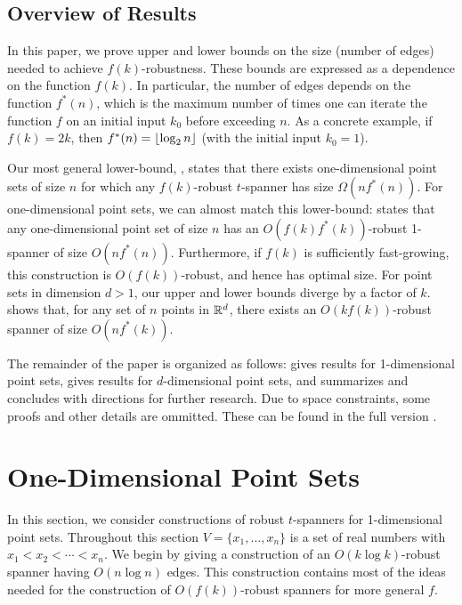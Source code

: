 \documentclass{cccg12}
\begin{document}
\subsection{Overview of Results}

In this paper, we prove upper and lower bounds on the size (number of
edges) needed to achieve $f(k)$-robustness.
These bounds are expressed as a dependence on the function $f(k)$.
In particular, the number of edges depends on the function $f^*(n)$,
which is the maximum number of times one can iterate the function $f$ on
an initial input $k_0$ before exceeding $n$.  As a concrete example, if
$f(k)=2k$, then  $f^*(n)={\lfloor \log_2 n \rfloor}$ (with the initial input $k_0=1$).

Our most general lower-bound, ,
states that there exists one-dimensional point sets of size $n$
for which any $f(k)$-robust $t$-spanner has size $\Omega(nf^*(n))$.
For one-dimensional point sets, we can almost match this lower-bound:
 states that any one-dimensional point set of size
$n$ has an $O(f(k)f^*(k))$-robust 1-spanner of size $O(nf^*(n))$.
Furthermore, if $f(k)$ is sufficiently fast-growing, this construction
is $O(f(k))$-robust, and hence has optimal size.  For point sets in
dimension $d>1$, our upper and lower bounds diverge by a factor of $k$.
 shows that, for any set of $n$ points in $\mathbb{R}^d$, there exists
an $O(kf(k))$-robust spanner of size $O(nf^*(k))$.

The remainder of the paper is organized as follows:  
gives results for 1-dimensional point sets,  gives results for
$d$-dimensional point sets, and  summarizes and concludes
with directions for further research.  Due to space constraints, some
proofs and other details are ommitted.  These can be found in the full
version \cite{bdms12}.

\section{One-Dimensional Point Sets}

In this section, we consider constructions of robust $t$-spanners for
1-dimensional point sets.  Throughout this section $V=\{x_1,\ldots,x_n\}$
is a set of real numbers with $x_1<x_2<\cdots<x_n$.  We begin by giving
a construction of an $O(k\log k)$-robust spanner having $O(n\log n)$
edges.  This construction contains most of the ideas needed for the
construction of $O(f(k))$-robust spanners for more general $f$.
\end{document}
